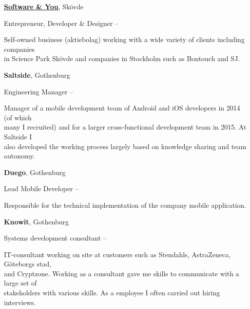 \documentclass[letterpaper,MMMyyyy,nonstopmode]{resume}
\begin{document}
\begin{Body}
\BigGap
\Entry
\href{http://softwareyou.se/}
{\textbf{Software \& You}}, Skövde

\Gap
\BulletItem
Entrepreneur, Developer \& Designer
\hfill
{} --
\begin{Detail}
\SubBulletItem
Self-owned business (aktiebolag) working with a wide variety of clients including companies\\in Science Park Skövde and companies in Stockholm such as Bontouch and SJ. 
\end{Detail}

\newpage

\BigGap
\Entry
\textbf{Saltside}, Gothenburg

\Gap
\BulletItem
Engineering Manager
\hfill
{} --

\begin{Detail}
\SubBulletItem
Manager of a mobile development team of Android and iOS developers in 2014 (of which\\many I recruited) and for a larger cross-functional development team in 2015. At Saltside I\\also developed the working process largely based on knowledge sharing and team autonomy.
\end{Detail}

\BigGap
\Entry
\textbf{Duego}, Gothenburg

\Gap
\BulletItem
Lead Mobile Developer
\hfill
{} --

\begin{Detail}
\SubBulletItem
Responsible for the technical implementation of the company mobile application.
\end{Detail}

\BigGap
\Entry
\textbf{Knowit}, Gothenburg

\Gap
\BulletItem
Systems development consultant
\hfill
{} --

\begin{Detail}
\SubBulletItem
IT-consultant working on site at customers such as Stendahls, AstraZeneca, Göteborgs stad,\\and Cryptzone. Working as a consultant gave me skills to communicate with a large set of\\stakeholders with various skills. As a employee I often carried out hiring interviews.
\end{Detail}


\end{Body}
\end{document}
